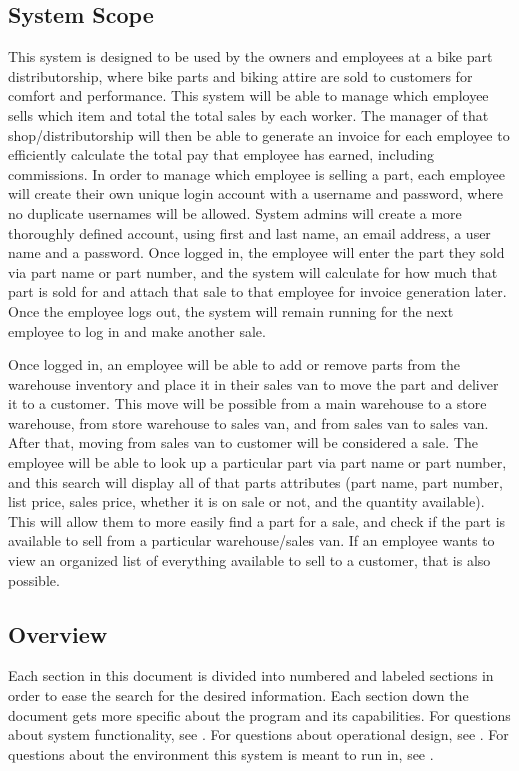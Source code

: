 \documentclass{report}
\begin{document}
\subsection{System Scope}
\label{sec:scope}
This system is designed to be used by the owners and employees at a bike part distributorship, where bike parts and biking attire are sold to customers for comfort and performance. This system will be able to manage which employee sells which item and total the total sales by each worker. The manager of that shop/distributorship will then be able to generate an invoice for each employee to efficiently calculate the total pay that employee has earned, including commissions. In order to manage which employee is selling a part, each employee will create their own unique login account with a username and password, where no duplicate usernames will be allowed. System admins will create a more thoroughly defined account, using first and last name, an email address, a user name and a password. Once logged in, the employee will enter the part they sold via part name or part number, and the system will calculate for how much that part is sold for and attach that sale to that employee for invoice generation later. Once the employee logs out, the system will remain running for the next employee to log in and make another sale.\par
Once logged in, an employee will be able to add or remove parts from the warehouse inventory and place it in their sales van to move the part and deliver it to a customer. This move will be possible from a main warehouse to a store warehouse, from store warehouse to sales van, and from sales van to sales van. After that, moving from sales van to customer will be considered a sale. The employee will be able to look up a particular part via part name or part number, and this search will display all of that parts attributes (part name, part number, list price, sales price, whether it is on sale or not, and the quantity available). This will allow them to more easily find a part for a sale, and check if the part is available to sell from a particular warehouse/sales van. If an employee wants to view an organized list of everything available to sell to a customer, that is also possible.\par
\subsection{Overview}
\label{sec:overview}
Each section in this document is divided into numbered and labeled sections in order to ease the search for the desired information. Each section down the document gets more specific about the program and its capabilities. For questions about system functionality, see . For questions about operational design, see . For questions about the environment this system is meant to run in, see .\par
\end{document}
